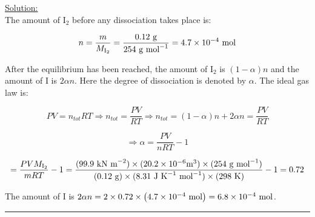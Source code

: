\noindent
\underline{Solution:}\\


The amount of I$_2$ before any dissociation takes place is:

$$n = \frac{m}{M_{\textnormal{I}_2}} = \frac{0.12\textnormal{ g}}{254\textnormal{ g mol}^{-1}} = 4.7\times 10^{-4}\textnormal{ mol}$$

After the equilibrium has been reached, the amount of I$_2$ is $(1 - \alpha)n$ and the amount of I is $2\alpha n$. Here the degree of dissociation is denoted by $\alpha$. The ideal gas law is:

$$PV = n_{tot}RT \Rightarrow n_{tot} = \frac{PV}{RT} \Rightarrow n_{tot} = (1 - \alpha)n + 2\alpha n = \frac{PV}{RT}$$

$$\Rightarrow \alpha = \frac{PV}{nRT} - 1$$

$$ = \frac{PVM_{\textnormal{I}_2}}{mRT} - 1 = \frac{(99.9\textnormal{ kN m}^{-2})\times(20.2\times 10^{-6}\textnormal{m}^3)\times(254\textnormal{ g mol}^{-1})}{(0.12\textnormal{ g})\times(8.31\textnormal{ J K}^{-1}\textnormal{ mol}^{-1})\times(298\textnormal{ K})} - 1 = 0.72$$

The amount of I is $2\alpha n = 2\times 0.72\times\left(4.7\times 10^{-4}\textnormal{ mol}\right) = 6.8\times 10^{-4}\textnormal{ mol}$.
\hrule\vspace{0.5cm}
